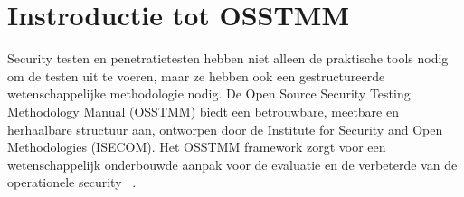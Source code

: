 

\section{Instroductie tot OSSTMM}

Security testen en penetratietesten hebben niet alleen de praktische tools nodig om de testen uit te voeren, maar ze hebben ook een gestructureerde wetenschappelijke methodologie nodig.
De Open Source Security Testing Methodology Manual (OSSTMM) biedt een betrouwbare, meetbare en herhaalbare structuur aan, ontworpen door de Institute for Security and Open Methodologies (ISECOM).
Het OSSTMM framework zorgt voor een wetenschappelijk onderbouwde aanpak voor de evaluatie en de verbeterde van de operationele security ~\autocite{Herzog}.

